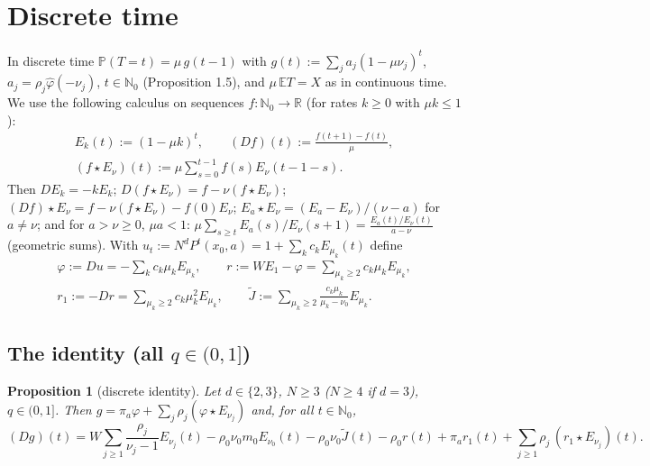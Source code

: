 \documentclass[11pt,a4paper]{article}
\newtheorem{proposition}[theorem]{Proposition}
\theoremstyle{definition}
\theoremstyle{remark}
\begin{document}
\setcounter{section}{6}
\section{Discrete time}

In discrete time $\mathbb P(T=t)=\mu\,g(t-1)$ with $g(t):=\sum_ja_j(1-\mu\nu_j)^t$, $a_j=\rho_j\hat\varphi(-\nu_j)$, $t\in\mathbb N_0$ (Proposition 1.5), and $\mu\,\mathbb ET=X$ as in continuous time. We use the following calculus on sequences $f:\mathbb N_0\to\mathbb R$ (for rates $k\ge0$ with $\mu k\le1$):
\begin{gather*}
E_k(t):=(1-\mu k)^t, \qquad (Df)(t):=\frac{f(t+1)-f(t)}{\mu}, \\
(f\star E_\nu)(t):=\mu\sum_{s=0}^{t-1}f(s)E_\nu(t-1-s).
\end{gather*}
Then $DE_k=-kE_k$; $D(f\star E_\nu)=f-\nu(f\star E_\nu)$; $(Df)\star E_\nu=f-\nu(f\star E_\nu)-f(0)E_\nu$; $E_a\star E_\nu=(E_a-E_\nu)/(\nu-a)$ for $a\ne\nu$; and for $a>\nu\ge0$, $\mu a<1$: $\mu\sum_{s\ge t}E_a(s)/E_\nu(s+1)=\frac{E_a(t)/E_\nu(t)}{a-\nu}$ (geometric sums). With $u_t:=N^dP^t(x_0,a)=1+\sum_kc_kE_{\mu_k}(t)$ define
\begin{gather*}
\varphi:=Du=-\sum_kc_k\mu_kE_{\mu_k}, \qquad r:=WE_1-\varphi=\sum_{\mu_k\ge2}c_k\mu_kE_{\mu_k}, \\
r_1:=-Dr=\sum_{\mu_k\ge2}c_k\mu_k^2E_{\mu_k}, \qquad \tilde J:=\sum_{\mu_k\ge2}\frac{c_k\mu_k}{\mu_k-\nu_0}E_{\mu_k}.
\end{gather*}

\subsection{The identity (all $q\in(0,1]$)}

\begin{proposition}[{discrete identity}]
Let $d\in\{2,3\}$, $N\ge3$ ($N\ge4$ if $d=3$), $q\in(0,1]$. Then $g=\pi_a\varphi+\sum_j\rho_j(\varphi\star E_{\nu_j})$ and, for all $t\in\mathbb N_0$,
\begin{equation*}
(Dg)(t)=W\sum_{j\ge1}\frac{\rho_j}{\nu_j-1}E_{\nu_j}(t)-\rho_0\nu_0m_0E_{\nu_0}(t)-\rho_0\nu_0\tilde J(t)-\rho_0r(t)+\pi_ar_1(t)+\sum_{j\ge1}\rho_j\,(r_1\star E_{\nu_j})(t).
\end{equation*}
\end{proposition}
\end{document}

